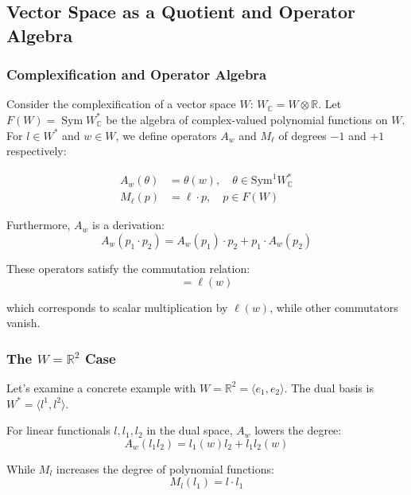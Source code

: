 \subsection{Vector Space as a Quotient and Operator Algebra}

\subsubsection{Complexification and Operator Algebra}

Consider the complexification of a vector space $W$: $W_\mathbb{C} = W \otimes \mathbb{R}$. Let $F(W) = \operatorname{Sym} W_{\mathbb{C}}^{*}$ be the algebra of complex-valued polynomial functions on $W$. For $l \in W^{*}$ and $w \in W$, we define operators $A_w$ and $M_\ell$ of degrees $-1$ and $+1$ respectively:

\begin{align}
A_w(\theta) &= \theta(w), \quad \theta \in \text{Sym}^1 W_\mathbb{C}^* \\
M_\ell(p) &= \ell \cdot p, \quad p \in F(W)
\end{align}

Furthermore, $A_{w}$ is a derivation:
\begin{equation}
A_w(p_1 \cdot p_2) = A_w(p_1) \cdot p_2 + p_1 \cdot A_w(p_2)
\end{equation}

These operators satisfy the commutation relation:
\begin{equation}
[A_w, M_\ell] = \ell(w)
\end{equation}

which corresponds to scalar multiplication by $\ell(w)$, while other commutators vanish.

\subsubsection{The $W = \mathbb{R}^2$ Case}

Let's examine a concrete example with $W = \mathbb{R}^2 = \langle e_{1}, e_{2} \rangle$. The dual basis is $W^{*} = \langle l^{1}, l^{2} \rangle$.

For linear functionals $l, l_{1}, l_{2}$ in the dual space, $A_{w}$ lowers the degree:
\begin{equation}
A_{w}(l_{1} l_{2}) = l_{1}(w) l_{2} + l_{1} l_{2}(w)
\end{equation}

While $M_{l}$ increases the degree of polynomial functions:
\begin{equation}
M_{l}(l_{1}) = l \cdot l_{1}
\end{equation}

